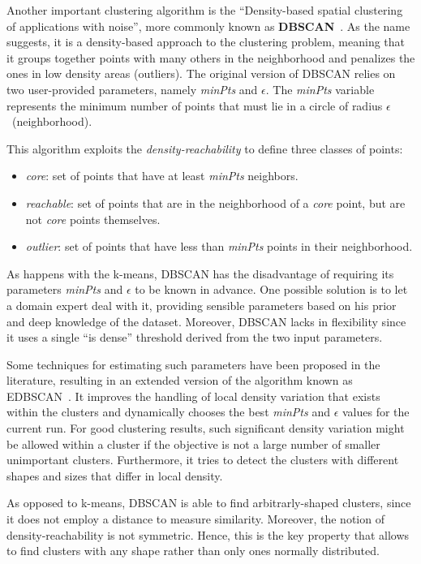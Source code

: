Another important clustering algorithm is the ``Density-based spatial clustering of applications with noise'', more commonly known as \textbf{DBSCAN}~\cite{ester1996density}.
As the name suggests, it is a density-based approach to the clustering problem,
meaning that it groups together points with many others in the neighborhood
and penalizes the ones in low density areas (outliers).
The original version of DBSCAN relies on two user-provided parameters, namely \emph{minPts} and $\epsilon$.
The \emph{minPts} variable represents the minimum number of points that must lie in a circle of radius $\epsilon$~(neighborhood).

This algorithm exploits the \emph{density-reachability} to define three classes of points:
\begin{itemize}
    \item \emph{core}: set of points that have at least \emph{minPts} neighbors.
    \item \emph{reachable}:
        set of points that are in the neighborhood of a \emph{core} point,
        but are not \emph{core} points themselves.
    \item \emph{outlier}:
        set of points that have less than \emph{minPts} points in their neighborhood.
\end{itemize}

As happens with the k-means, DBSCAN has the disadvantage of requiring its parameters \emph{minPts} and $\epsilon$ to be known in advance.
One possible solution is to let a domain expert deal with it, providing sensible parameters based on his prior and deep knowledge of the dataset.
Moreover, DBSCAN lacks in flexibility since it uses a single ``is dense'' threshold derived from the two input parameters.

Some techniques for estimating such parameters have been proposed in the literature, resulting in an extended version of the algorithm known as EDBSCAN~\cite{elbatta2013dynamic, ram2009enhanced}.
It improves the handling of local density variation that exists within the clusters and dynamically chooses the best \emph{minPts} and $\epsilon$ values for the current run.
For good clustering results, such significant density variation might be allowed within a cluster if the objective is not a large number of smaller unimportant clusters.
Furthermore, it tries to detect the clusters with different shapes and sizes that differ in local density.

As opposed to k-means, DBSCAN is able to find arbitrarly-shaped clusters, since it does not employ a distance to measure similarity.
Moreover, the notion of density-reachability is not symmetric.
Hence, this is the key property that allows to find clusters with any shape rather than only ones normally distributed.
